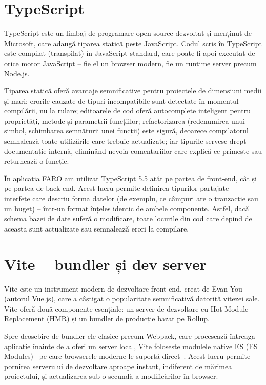 \documentclass[12pt,a4paper,oneside]{report}
\begin{document}
\section{TypeScript}

TypeScript este un limbaj de programare open-source dezvoltat și menținut de Microsoft, care adaugă tiparea statică peste JavaScript. Codul scris în TypeScript este compilat (transpilat) în JavaScript standard, care poate fi apoi executat de orice motor JavaScript -- fie el un browser modern, fie un runtime server precum Node.js. \cite{ref:typescript}

Tiparea statică oferă avantaje semnificative pentru proiectele de dimensiuni medii și mari: erorile cauzate de tipuri incompatibile sunt detectate în momentul compilării, nu la rulare; editoarele de cod oferă autocomplete inteligent pentru proprietăți, metode și parametrii funcțiilor; refactorizarea (redenumirea unui simbol, schimbarea semnăturii unei funcții) este sigură, deoarece compilatorul semnalează toate utilizările care trebuie actualizate; iar tipurile servesc drept documentație internă, eliminând nevoia comentariilor care explică ce primește sau returnează o funcție.

În aplicația FARO am utilizat TypeScript 5.5 atât pe partea de front-end, cât și pe partea de back-end. Acest lucru permite definirea tipurilor partajate -- interfețe care descriu forma datelor (de exemplu, ce câmpuri are o tranzacție sau un buget) -- într-un format înțeles identic de ambele componente. Astfel, dacă schema bazei de date suferă o modificare, toate locurile din cod care depind de aceasta sunt actualizate sau semnalează erori la compilare.

\section{Vite -- bundler și dev server}

Vite este un instrument modern de dezvoltare front-end, creat de Evan You (autorul Vue.js), care a câștigat o popularitate semnificativă datorită vitezei sale. Vite oferă două componente esențiale: un server de dezvoltare cu Hot Module Replacement (HMR) și un bundler de producție bazat pe Rollup. \cite{ref:vite}

Spre deosebire de bundler-ele clasice precum Webpack, care procesează întreaga aplicație înainte de a oferi un server local, Vite folosește modulele native ES (ES Modules)~\cite{ref:mdn-esm} pe care browserele moderne le suportă direct~\cite{ref:vite}. Acest lucru permite pornirea serverului de dezvoltare aproape instant, indiferent de mărimea proiectului, și actualizarea sub o secundă a modificărilor în browser.
\end{document}
